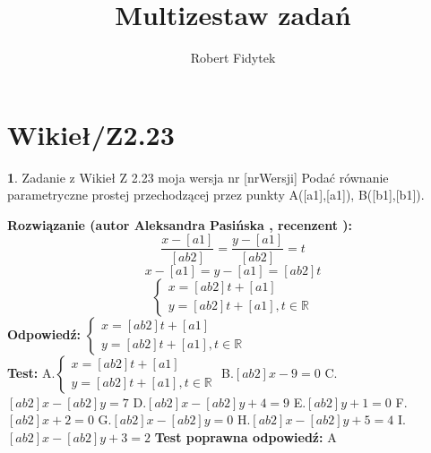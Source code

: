 \documentclass[12pt, a4paper]{article}
\title{Multizestaw zadań}
\author{Robert Fidytek}
\date{}
\theoremstyle{definition} %
\newtheorem{zad}{}
\newcommand{\kategoria}[1]{\section{#1}} %
\newcommand{\zadStart}[1]{\begin{zad}#1\newline} %
\newcommand{\zadStop}{\end{zad}}   %
\newcommand{\rozwStart}[2]{\noindent \textbf{Rozwiązanie (autor #1 , recenzent #2): }\newline} %
\newcommand{\rozwStop}{\newline}                                            %
\newcommand{\odpStart}{\noindent \textbf{Odpowiedź:}\newline}    %
\newcommand{\odpStop}{\newline}                                             %
\newcommand{\testStart}{\noindent \textbf{Test:}\newline} %
\newcommand{\testStop}{\newline} %
\newcommand{\kluczStart}{\noindent \textbf{Test poprawna odpowiedź:}\newline} %
\newcommand{\kluczStop}{\newline} %
\begin{document}
\maketitle


\kategoria{Wikieł/Z2.23}
\zadStart{Zadanie z Wikieł Z 2.23 moja wersja nr [nrWersji]}
Podać równanie parametryczne prostej przechodzącej przez punkty A([a1],[a1]), B([b1],[b1]).
\zadStop
\rozwStart{Aleksandra Pasińska}{}
$$\frac{x-[a1]}{[ab2]}=\frac{y-[a1]}{[ab2]}=t$$
$$x-[a1]=y-[a1]=[ab2]t$$
$$\left\{ \begin{array}{ll}
x=[ab2]t+[a1]\\
y=[ab2]t+[a1], t\in \mathbb{R}
\end{array} \right.$$
\rozwStop
\odpStart
$\left\{ \begin{array}{ll}
x=[ab2]t+[a1]\\
y=[ab2]t+[a1], t\in \mathbb{R}
\end{array} \right.$\\
\odpStop
\testStart
A.$\left\{ \begin{array}{ll}
x=[ab2]t+[a1]\\
y=[ab2]t+[a1], t\in \mathbb{R}
\end{array} \right.$
B.$[ab2]x-9=0$
C.$[ab2]x-[ab2]y=7$
D.$[ab2]x-[ab2]y+4=9$
E.$[ab2]y+1=0$
F.$[ab2]x+2=0$
G.$[ab2]x-[ab2]y=0$
H.$[ab2]x-[ab2]y+5=4$
I.$[ab2]x-[ab2]y+3=2$
\testStop
\kluczStart
A
\kluczStop
\end{document}
